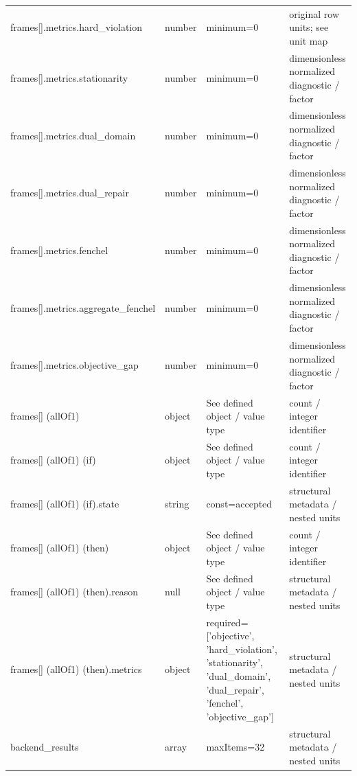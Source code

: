 \begin{longtable}{@{}>{\raggedright\arraybackslash}p{}>{\raggedright\arraybackslash}p{}>{\raggedright\arraybackslash}p{}>{\raggedright\arraybackslash}p{}@{}}
frames[].\allowbreak{}metrics.\allowbreak{}hard\_\allowbreak{}violation & number & minimum=\allowbreak{}0 & original row units; see unit map\\
frames[].\allowbreak{}metrics.\allowbreak{}stationarity & number & minimum=\allowbreak{}0 & dimensionless normalized diagnostic /\allowbreak{} factor\\
frames[].\allowbreak{}metrics.\allowbreak{}dual\_\allowbreak{}domain & number & minimum=\allowbreak{}0 & dimensionless normalized diagnostic /\allowbreak{} factor\\
frames[].\allowbreak{}metrics.\allowbreak{}dual\_\allowbreak{}repair & number & minimum=\allowbreak{}0 & dimensionless normalized diagnostic /\allowbreak{} factor\\
frames[].\allowbreak{}metrics.\allowbreak{}fenchel & number & minimum=\allowbreak{}0 & dimensionless normalized diagnostic /\allowbreak{} factor\\
frames[].\allowbreak{}metrics.\allowbreak{}aggregate\_\allowbreak{}fenchel & number & minimum=\allowbreak{}0 & dimensionless normalized diagnostic /\allowbreak{} factor\\
frames[].\allowbreak{}metrics.\allowbreak{}objective\_\allowbreak{}gap & number & minimum=\allowbreak{}0 & dimensionless normalized diagnostic /\allowbreak{} factor\\
frames[] (allOf1) & object & See defined object /\allowbreak{} value type & count /\allowbreak{} integer identifier\\
frames[] (allOf1) (if) & object & See defined object /\allowbreak{} value type & count /\allowbreak{} integer identifier\\
frames[] (allOf1) (if).\allowbreak{}state & string & const=\allowbreak{}accepted & structural metadata /\allowbreak{} nested units\\
frames[] (allOf1) (then) & object & See defined object /\allowbreak{} value type & count /\allowbreak{} integer identifier\\
frames[] (allOf1) (then).\allowbreak{}reason & null & See defined object /\allowbreak{} value type & structural metadata /\allowbreak{} nested units\\
frames[] (allOf1) (then).\allowbreak{}metrics & object & required=\allowbreak{}['objective', 'hard\_\allowbreak{}violation', 'stationarity', 'dual\_\allowbreak{}domain', 'dual\_\allowbreak{}repair', 'fenchel', 'objective\_\allowbreak{}gap'] & structural metadata /\allowbreak{} nested units\\
backend\_\allowbreak{}results & array & maxItems=\allowbreak{}32 & structural metadata /\allowbreak{} nested units\\

\end{longtable}
